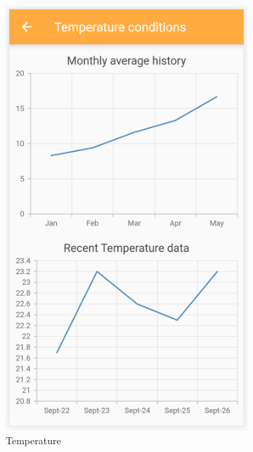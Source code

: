 \begin{figure}
\begin{subfigure}[b]{0.3\columnwidth}
        \includegraphics[width=\columnwidth]{images/temperature.png}
        \caption{Temperature}
    \end{subfigure}
    \\
    \begin{subfigure}[b]{0.3\columnwidth}
        \centering

\end{subfigure}
\end{figure}
